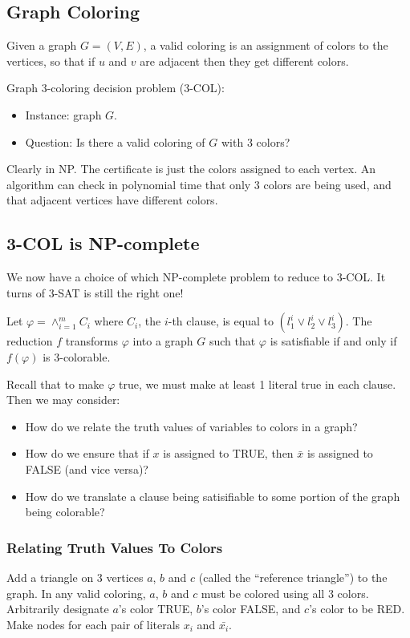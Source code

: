 \subsection{Graph Coloring}
Given a graph $G = (V, E)$, a valid coloring is an assignment of colors to the vertices, so that if $u$ and $v$ are adjacent then they get different colors.

Graph 3-coloring decision problem (3-COL):
\begin{itemize}
	\item Instance: graph $G$.
	\item Question: Is there a valid coloring of $G$ with 3 colors?
\end{itemize}

Clearly in NP. The certificate is just the colors assigned to each vertex. An algorithm can check in polynomial time that only 3 colors are being used, and that adjacent vertices have different colors.

\subsection{3-COL is NP-complete}
We now have a choice of which NP-complete problem to reduce to 3-COL. It turns of 3-SAT is still the right one!

Let $\varphi = \wedge_{i=1}^m C_i$ where $C_i$, the $i$-th clause, is equal to $(l_1^i \vee l_2^i \vee l_3^i)$. The reduction $f$ transforms $\varphi$ into a graph $G$ such that $\varphi$ is satisfiable if and only if $f(\varphi)$ is 3-colorable.

Recall that to make $\varphi$ true, we must make at least 1 literal true in each clause. Then we may consider:
\begin{itemize}
	\item How do we relate the truth values of variables to colors in a graph?
	\item How do we ensure that if $x$ is assigned to TRUE, then $\bar{x}$ is assigned to FALSE (and vice versa)?
	\item How do we translate a clause being satisifiable to some portion of the graph being colorable?
\end{itemize}
\subsubsection{Relating Truth Values To Colors}
Add a triangle on 3 vertices $a$, $b$ and $c$ (called the ``reference triangle'') to the graph. In any valid coloring, $a$, $b$ and $c$ must be colored using all 3 colors. Arbitrarily designate $a$'s color TRUE, $b$'s color FALSE, and $c$'s color to be RED. Make nodes for each pair of literals $x_i$ and $\bar{x_i}$. 

